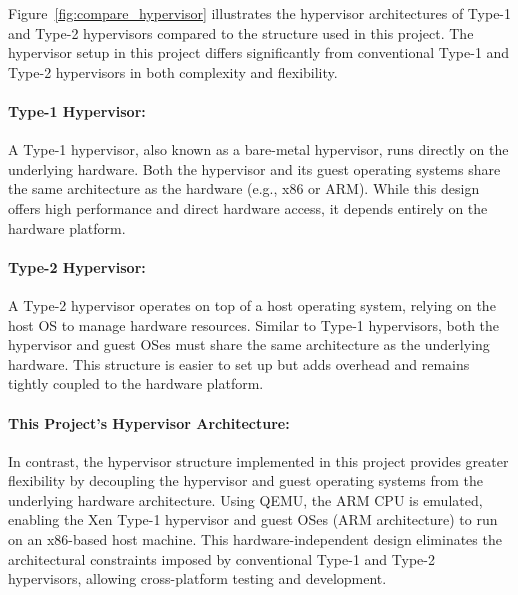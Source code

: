 \documentclass[acmtog]{acmart}
\begin{document}
Figure~\ref{fig:compare_hypervisor} illustrates the hypervisor architectures of Type-1 and Type-2 hypervisors compared to the structure used in this project. The hypervisor setup in this project differs significantly from conventional Type-1 and Type-2 hypervisors in both complexity and flexibility.

\paragraph{Type-1 Hypervisor:}
A Type-1 hypervisor, also known as a bare-metal hypervisor, runs directly on the underlying hardware. Both the hypervisor and its guest operating systems share the same architecture as the hardware (e.g., x86 or ARM). While this design offers high performance and direct hardware access, it depends entirely on the hardware platform.

\paragraph{Type-2 Hypervisor:}
A Type-2 hypervisor operates on top of a host operating system, relying on the host OS to manage hardware resources. Similar to Type-1 hypervisors, both the hypervisor and guest OSes must share the same architecture as the underlying hardware. This structure is easier to set up but adds overhead and remains tightly coupled to the hardware platform.

\paragraph{This Project's Hypervisor Architecture:}
In contrast, the hypervisor structure implemented in this project provides greater flexibility by decoupling the hypervisor and guest operating systems from the underlying hardware architecture. Using QEMU, the ARM CPU is emulated, enabling the Xen Type-1 hypervisor and guest OSes (ARM architecture) to run on an x86-based host machine. This hardware-independent design eliminates the architectural constraints imposed by conventional Type-1 and Type-2 hypervisors, allowing cross-platform testing and development.
\end{document}
